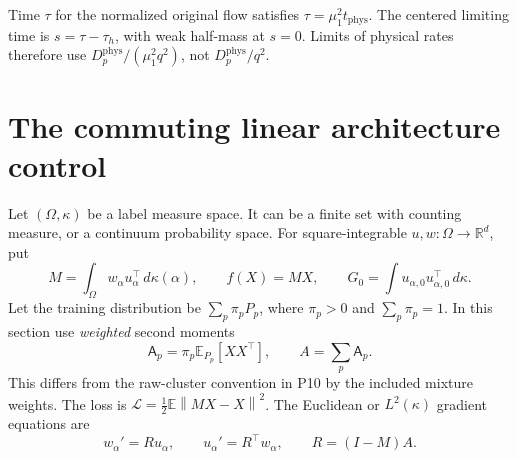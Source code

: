 \documentclass[11pt]{article}
\numberwithin{equation}{section}
\theoremstyle{remark}\newtheorem{remark}[theorem]{Remark}
\newcommand{\E}{\mathbb E}
\newcommand{\R}{\mathbb R}
\newcommand{\dd}{\,d}
\newcommand{\norm}[1]{\left\lVert#1\right\rVert}
\begin{document}
Time $\tau$ for the normalized original flow satisfies
$\tau=\mu_1^2t_{\mathrm{phys}}$. The centered limiting time is
$s=\tau-\tau_h$, with weak half-mass at $s=0$. Limits of physical rates
therefore use $D_p^{\mathrm{phys}}/(\mu_1^2q^2)$, not
$D_p^{\mathrm{phys}}/q^2$.

\section{The commuting linear architecture control}
\label{inc:LP:v1:linear}
Let $(\Omega,\kappa)$ be a label measure space. It can be a finite set with
counting measure, or a continuum probability space. For square-integrable
$u,w:\Omega\to\R^d$, put
\[
 M=\int_\Omega w_\alpha u_\alpha^\top\dd\kappa(\alpha),
 \qquad f(X)=MX,\qquad G_0=\int u_{\alpha,0}u_{\alpha,0}^\top\dd\kappa.
\]
Let the training distribution be $\sum_p\pi_pP_p$, where $\pi_p>0$ and
$\sum_p\pi_p=1$. In this section use \emph{weighted} second moments
\[
 \mathsf A_p=\pi_p\E_{P_p}[XX^\top],\qquad A=\sum_p\mathsf A_p.
\]
This differs from the raw-cluster convention in P10 by the included
mixture weights. The loss is $\mathcal L=\tfrac12\E\norm{MX-X}^2$.
The Euclidean or $L^2(\kappa)$ gradient equations are
\begin{equation}\label{inc:LP:v1:label-flow}
 w_\alpha'=Ru_\alpha,\qquad u_\alpha'=R^\top w_\alpha,
 \qquad R=(I-M)A.
\end{equation}
\end{document}
